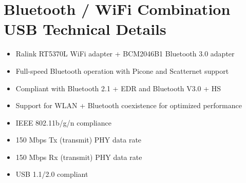 \chapter*{Bluetooth / WiFi Combination USB Technical Details} %
\label{sec:bluetooth_wifi_combination_usb_technical_details}
\begin{itemize}
    \item Ralink RT5370L WiFi adapter + BCM2046B1 Bluetooth 3.0 adapter
    \item Full-speed Bluetooth operation with Picone and Scatternet support
    \item Compliant with Bluetooth 2.1 + EDR and Bluetooth V3.0 + HS
    \item Support for WLAN + Bluetooth coexistence for optimized performance
    \item IEEE 802.11b/g/n compliance
    \item 150 Mbps Tx (transmit) PHY data rate
    \item 150 Mbps Rx (transmit) PHY data rate
    \item USB 1.1/2.0 compliant
\end{itemize}
